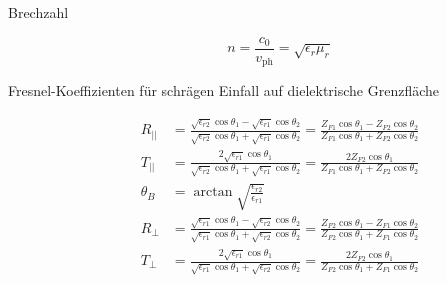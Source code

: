 \begin{description}
\item[Brechzahl]
\begin{equation*}
n = \frac{c_0}{v_\text{ph}} = \sqrt{\epsilon_r\mu_r}
\end{equation*}

\item[Fresnel-Koeffizienten für schrägen Einfall auf dielektrische Grenzfläche] 
\begin{align*}
R_{||} &= \frac{\sqrt{\epsilon_{r2}} \cos{\theta_1} - \sqrt{\epsilon_{r1}} \cos{\theta_2}}{\sqrt{\epsilon_{r2}} \cos{\theta_1} + \sqrt{\epsilon_{r1}} \cos{\theta_2}} = \frac{Z_{F1} \cos{\theta_1} - Z_{F2} \cos{\theta_2}}{Z_{F1} \cos{\theta_1} + Z_{F2} \cos{\theta_2}} \\
T_{||} &= \frac{2 \sqrt{\epsilon_{r1}} \cos{\theta_1}}{\sqrt{\epsilon_{r2}} \cos{\theta_1} + \sqrt{\epsilon_{r1}} \cos{\theta_2}} = \frac{2 Z_{F2} \cos{\theta_1}}{Z_{F1} \cos{\theta_1} + Z_{F2} \cos{\theta_2}} \\
\theta_B &= \arctan\sqrt{\frac{\epsilon_{r2}}{\epsilon_{r1}}} \\
R_\bot &= \frac{\sqrt{\epsilon_{r1}} \cos{\theta_1} - \sqrt{\epsilon_{r2}} \cos{\theta_2}}{\sqrt{\epsilon_{r1}} \cos{\theta_1} + \sqrt{\epsilon_{r2}} \cos{\theta_2}}  = \frac{Z_{F2} \cos{\theta_1} - Z_{F1} \cos{\theta_2}}{Z_{F2} \cos{\theta_1} + Z_{F1} \cos{\theta_2}} \\
T_\bot &= \frac{2 \sqrt{\epsilon_{r1}} \cos{\theta_1}}{\sqrt{\epsilon_{r1}} \cos{\theta_1} + \sqrt{\epsilon_{r2}} \cos{\theta_2}} = \frac{2 Z_{F2} \cos{\theta_1}}{Z_{F2} \cos{\theta_1} + Z_{F1} \cos{\theta_2}} \\
\end{align*}
\end{description}
